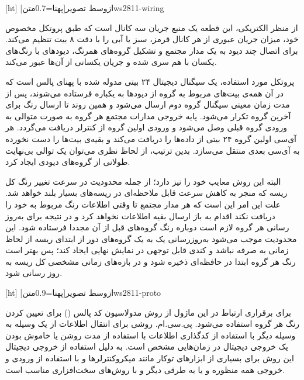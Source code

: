 [ht]
‌ازوسط
‌تصویر[پهنا=0.7‌متن]{ws2811-wiring}

از منظر الکتریکی، این قطعه یک منبع جریان سه کانال است که طبق پروتکل مخصوص خود، میزان جریان عبوری از هر کانال قرمز، سبز یا آبی را با دقت ۸ بیت تنظیم می‌کند. برای اتصال چند دیود به یک مدار مجتمع و تشکیل گروه‌های همرنگ، دیودهای با رنگ‌های یکسان با هم سری شده و جریان یکسانی از آن‌ها عبور می‌کند.

پروتکل مورد استفاده، یک سیگنال دیجیتال ۲۴ بیتی مدوله شده با پهنای پالس است که در آن همه‌ی بیت‌های مربوط به گروه از دیودها به یکباره فرستاده می‌شوند، پس از مدت زمان معینی سیگنال گروه دوم ارسال می‌شود و همین روند تا ارسال رنگ برای آخرین گروه تکرار می‌شود. پایه خروجی مدارات مجتمع هر گروه به صورت متوالی به ورودی گروه قبلی وصل می‌شود و ورودی اولین گروه از کنترلر دریافت می‌گردد. هر آی‌سی اولین گروه ۲۴ بیتی از داده‌ها را دریافت می‌کند و بقیه‌ی بیت‌ها را دست نخورده به آی‌سی بعدی منتقل می‌سازد. بدین ترتیب، از لحاظ نظری می‌توان یک توالی بی‌نهایت طولانی از گروه‌های دیودی ایجاد کرد.

البته این روش معایب خود را نیز دارد؛ از جمله محدودیت در سرعت تغییر رنگ کل ریسه که منجر به کاهش سرعت قابل ملاحظه‌ای در ریسه‌های بسیار بلند خواهد شد. علت این امر این است که هر مدار مجتمع تا وقتی اطلاعات رنگ مربوط به خود را دریافت نکند اقدام به باز ارسال بقیه اطلاعات نخواهد کرد و در نتیجه برای به‌روز رسانی هر گروه لازم است دوباره رنگ گروه‌های قبل از آن مجددا فرستاده شود. این محدودیت موجب می‌شود به‌روزرسانی یک به یک گروه‌های دور از ابتدای ریسه از لحاظ زمانی به صرفه نباشد و کندی قابل توجهی در نمایش نهایی ایجاد کند؛ پس بهتر است رنگ هر گروه ابتدا در حافظه‌ای ذخیره شود و در بازه‌های زمانی مشخصی کل ریسه به روز رسانی شود.


[ht]
‌ازوسط
‌تصویر[پهنا=0.9‌متن]{ws2811-proto}

برای برقراری ارتباط در این ماژول از روش مدولاسیون کد پالس () برای تعیین کردن رنگ هر گروه استفاده می‌شود. پی.سی.ام. روشی برای انتقال اطلاعات از یک وسیله به وسیله دیگر با استفاده از کدگذاری اطلاعات با استفاده از مدت روشن یا خاموش بودن یک خروجی دیجیتال در زمان‌هایی مشخص است. به دلیل استفاده از خروجی دیجیتال این روش برای بسیاری از ابزارهای توکار مانند میکروکنترلرها و با استفاده از ورودی و خروجی همه منظوره و یا به طرقی دیگر و با روش‌های سخت‌افزاری مناسب است.

